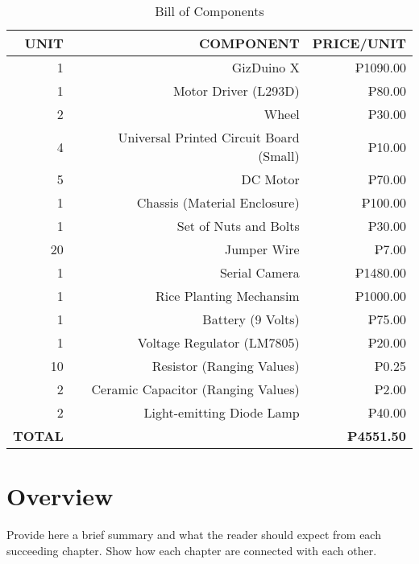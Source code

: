 \begin{table}[htbp]
  \centering
  \caption{Bill of Components}
    \begin{tabular}{rrr}
    \toprule
    \textbf{UNIT} & \textbf{COMPONENT} & \textbf{PRICE/UNIT} \\
    \midrule
    1     & GizDuino X & ₱1090.00 \\
    1     & Motor Driver (L293D) & ₱80.00 \\
    2     & Wheel & ₱30.00 \\
    4     & Universal Printed Circuit Board (Small) & ₱10.00 \\
    5     & DC Motor & ₱70.00 \\
    1     & Chassis (Material Enclosure) & ₱100.00 \\
    1     & Set of Nuts and Bolts & ₱30.00 \\
    20    & Jumper Wire & ₱7.00 \\
    1     & Serial Camera & ₱1480.00 \\
    1     & Rice Planting Mechansim & ₱1000.00 \\
    1     & Battery (9 Volts) & ₱75.00 \\
    1     & Voltage Regulator (LM7805) & ₱20.00 \\
    ~10   & Resistor (Ranging Values) & ₱0.25 \\
    ~2    & Ceramic Capacitor (Ranging Values) & ₱2.00 \\
    2     & Light-emitting Diode Lamp & ₱40.00 \\
		\midrule
    \textbf{TOTAL} & \textbf{} & \textbf{~₱4551.50} \\
    \bottomrule
    \end{tabular}%
  \label{tab:addlabel}%
\end{table}%



\section{Overview}

Provide here a brief summary and what the reader should expect from each succeeding chapter.  Show how each chapter are connected with each other.

